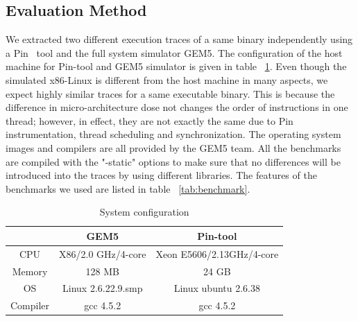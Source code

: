 \documentclass[10pt,journal,cspaper,compsoc]{IEEEtran}
\begin{document}
\subsection{Evaluation Method}
\label{sec:eval}
We extracted two different execution traces of a
same binary independently using a Pin~\cite{pin10} tool and the full system simulator GEM5. The configuration of the host machine for Pin-tool and
GEM5 simulator is given in table
~\ref{tab:sysconfig}. Even though the simulated x86-Linux is
different from the host machine in many aspects, we expect highly
similar traces for a same executable binary. This is because the
difference in micro-architecture dose not changes the order of
instructions in one thread; however, in effect, they are not
exactly the same due to Pin instrumentation, thread scheduling and synchronization. The
operating system images and compilers are all provided by the GEM5
team. All the benchmarks are compiled with the "-static" options to make
sure that no differences will be introduced into the traces by using
different libraries. The features of the benchmarks we used are listed in table
~\ref{tab:benchmark}.

\begin{table}
\caption{System configuration} \label{tab:sysconfig} \centering
\begin{tabular}{|c|c|c|}
\hline  & GEM5 & Pin-tool \\
\hline CPU & X86/2.0 GHz/4-core & Xeon E5606/2.13GHz/4-core \\
\hline Memory & 128 MB & 24 GB \\
\hline OS & Linux 2.6.22.9.smp & Linux ubuntu 2.6.38 \\
\hline Compiler & gcc 4.5.2 & gcc 4.5.2 \\
\hline
\end{tabular}
\end{table}
%
%
\end{document}
